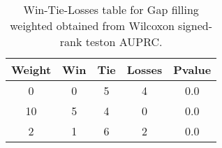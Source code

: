 \begin{table}[H]
\centering
\begin{tabular}{|c|c|c|c|c|}

\textbf{Weight} &  \textbf{Win} &  \textbf{Tie} &  \textbf{Losses} &  \textbf{Pvalue} \\
\hline

              0 &             0 &             5 &                4 &              0.0 \\
\hline
             10 &             5 &             4 &                0 &              0.0 \\
\hline
              2 &             1 &             6 &                2 &              0.0 \\
\hline

\end{tabular}
\caption{Win-Tie-Losses table for Gap filling weighted obtained from Wilcoxon signed-rank teston AUPRC.}
\label{tab:gap_filling_weighted_weighted_cae_comparison}
\end{table}